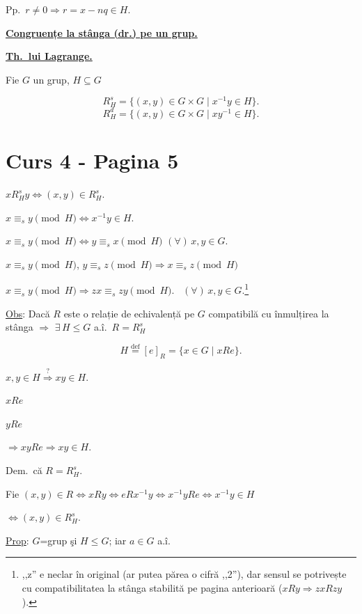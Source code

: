 \noindent Pp.\ $r\neq 0 \Rightarrow r=x-nq\in H$.

\bigskip
\noindent\underline{\textbf{Congruențe la stânga (dr.) pe un grup.}}

\noindent\underline{\textbf{Th.\ lui Lagrange.}}

\bigskip
\noindent Fie $G$ un grup, $H\subseteq G$

\[
R_H^s = \{(x,y)\in G\times G \mid x^{-1}y\in H\}.
\]
\[
R_H^d = \{(x,y)\in G\times G \mid xy^{-1}\in H\}.
\]




\section*{Curs 4 - Pagina 5}

\noindent $xR_H^s y \Leftrightarrow (x,y)\in R_H^s$.

\noindent $x\equiv_s y \pmod H \Leftrightarrow x^{-1}y\in H$.

\bigskip
\noindent $x\equiv_s y \pmod H \Leftrightarrow y\equiv_s x \pmod H$ $(\forall)\, x,y\in G$.

\noindent $x\equiv_s y \pmod H$, $y\equiv_s z \pmod H \Rightarrow x\equiv_s z \pmod H$

\bigskip
\noindent $x\equiv_s y \pmod H \Rightarrow zx\equiv_s zy \pmod H$. \ $(\forall)\, x,y\in G$.\footnote{,,z'' e neclar în original (ar putea părea o cifră ,,2''), dar sensul se potrivește cu compatibilitatea la stânga stabilită pe pagina anterioară ($xRy\Rightarrow zxRzy$).}

\bigskip
\noindent\underline{Obs}: Dacă $R$ este o relație de echivalență pe $G$ compatibilă cu înmulțirea la stânga $\Rightarrow$ $\exists\, H\leq G$ a.î.\ $R=R_H^s$

\[
H \overset{\text{def}}{=} [e]_R = \{x\in G \mid xRe\}.
\]

\noindent $x,y\in H \overset{?}{\Rightarrow} xy\in H$.

\noindent $xRe$

\noindent $yRe$

\noindent $\Rightarrow xyRe \Rightarrow xy\in H$.

\bigskip
\noindent Dem.\ că $R=R_H^s$.

\noindent Fie $(x,y)\in R \Leftrightarrow xRy \Leftrightarrow eRx^{-1}y \Leftrightarrow x^{-1}yRe \Leftrightarrow x^{-1}y\in H$

\noindent $\Leftrightarrow (x,y)\in R_H^s$.

\bigskip
\noindent\underline{Prop}: $G$=grup şi $H\leq G$; iar $a\in G$ a.î.

